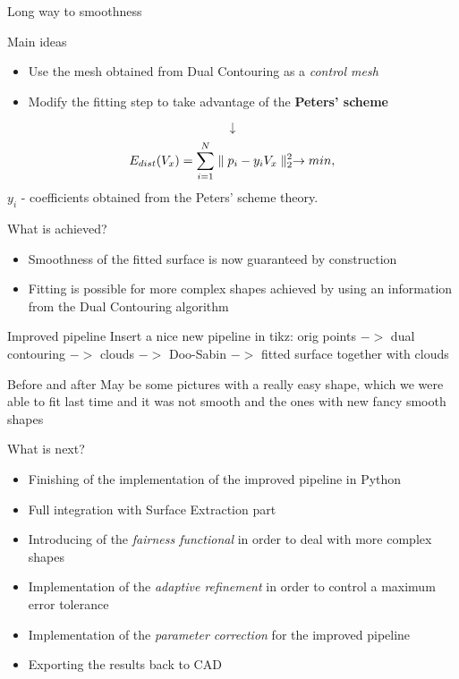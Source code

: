 \begin{frame}{Long way to smoothness}
\begin{block}{Main ideas}
\begin{itemize}
\item Use the mesh obtained from Dual Contouring as a \textit{control mesh}
\item Modify the fitting step to take advantage of the \textbf{Peters' scheme}
\end{itemize}
\end{block}
$$\downarrow$$
\begin{equation}
E_{dist}(V_{x}) = \sum_{i=1}^{N}\norm{p_{i} - y_{i}V_{x}}^{2} \rightarrow min,
\end{equation}
$y_{i}$ - coefficients obtained from the Peters' scheme theory.
\begin{block}{What is achieved?}
\begin{itemize}
\item Smoothness of the fitted surface is now guaranteed by construction
\item Fitting is possible for more complex shapes achieved by using an information from the Dual Contouring algorithm
\end{itemize}
\end{block}
\end{frame}
\begin{frame}{Improved pipeline}
Insert a nice new pipeline in tikz: orig points $->$ dual contouring $->$ clouds $->$ Doo-Sabin $->$ fitted surface together with clouds
\end{frame}
\begin{frame}{Before and after}
May be some pictures with a really easy shape, which we were able to fit last time and it was not smooth and the ones with new fancy smooth shapes
\end{frame}
\begin{frame}{What is next?}
\begin{itemize}
\item Finishing of the implementation of the improved pipeline in Python
\item Full integration with Surface Extraction part
\item Introducing of the \textit{fairness functional} in order to deal with more complex shapes
\item Implementation of the \textit{adaptive refinement} in order to control a maximum error tolerance
\item Implementation of the \textit{parameter correction} for the improved pipeline
\item Exporting the results back to CAD  
\end{itemize}
\end{frame}